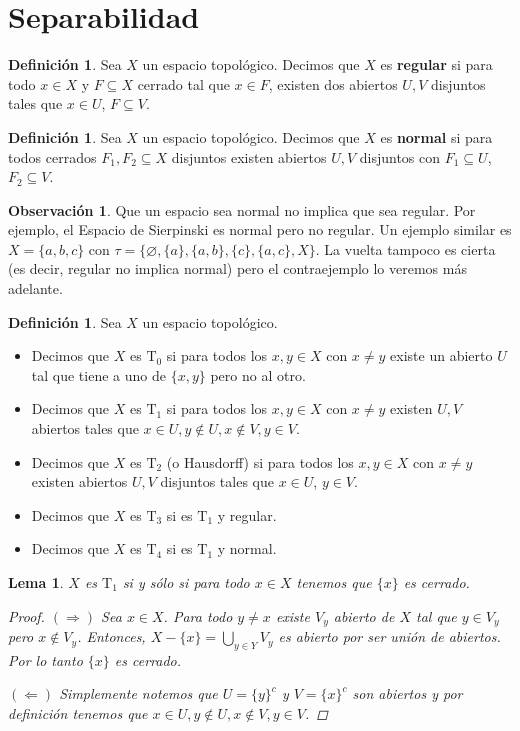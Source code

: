 \documentclass[12pt]{book}
\newtheorem{lem}[teo]{Lema}
\theoremstyle{definition}
\newtheorem{obs}[teo]{Observación}
\newtheorem{defn}[teo]{Definición}
\let\emptyset\varnothing
\begin{document}
\section{Separabilidad}

\begin{defn}
Sea $X$ un espacio topológico. Decimos que $X$ es \textbf{regular} si para todo $x\in X$ y $F\subseteq X$ cerrado tal que $x\in F$, existen dos abiertos $U,V$ disjuntos tales que $x\in U$, $F\subseteq V$.
\end{defn}

\begin{defn}
Sea $X$ un espacio topológico. Decimos que $X$ es \textbf{normal} si para todos cerrados $F_1,F_2\subseteq X$ disjuntos existen abiertos $U,V$ disjuntos con $F_1\subseteq U$, $F_2\subseteq V$.
\end{defn}

\begin{obs}
Que un espacio sea normal no implica que sea regular. Por ejemplo, el Espacio de Sierpinski es normal pero no regular. Un ejemplo similar es $X=\{a,b,c\}$ con $\tau = \{\emptyset, \{a\}, \{a,b\}, \{c\}, \{a,c\},X\}$. La vuelta tampoco es cierta (es decir, regular no implica normal) pero el contraejemplo lo veremos más adelante.
\end{obs}

\begin{defn}
Sea $X$ un espacio topológico.
\begin{itemize}\item Decimos que $X$ es $\mathrm{T}_0$ si para todos los $x,y\in X$ con $x\neq y$ existe un abierto $U$ tal que tiene a uno de $\{x,y\}$ pero no al otro.
\item Decimos que $X$ es $\mathrm{T}_1$ si para todos los $x,y\in X$ con $x\neq y$ existen $U,V$ abiertos tales que $x\in U, y\notin U, x\notin V, y\in V$.
\item Decimos que $X$ es $\mathrm{T}_2$ (o Hausdorff) si para todos los $x,y\in X$ con $x\neq y$ existen abiertos $U,V$ disjuntos tales que $x\in U$, $y\in V$.
\item Decimos que $X$ es $\mathrm{T}_3$ si es $\mathrm{T}_1$ y regular.
\item Decimos que $X$ es $\mathrm{T}_4$ si es $\mathrm{T}_1$ y normal.
\end{itemize}
\end{defn}

\begin{lem}
$X$ es $\mathrm{T}_1$ si y sólo si para todo $x\in X$ tenemos que $\{x\}$ es cerrado.
\begin{proof}
$(\Longrightarrow)$ Sea $x\in X$. Para todo $y\neq x$ existe $V_y$ abierto de $X$ tal que $y\in V_y$ pero $x\notin V_y$. Entonces, $X-\{x\} = \displaystyle\bigcup_{y\in Y}V_y$ es abierto por ser unión de abiertos. Por lo tanto $\{x\}$ es cerrado.

$(\Longleftarrow)$ Simplemente notemos que $U = \{y\}^c$ y $V = \{x\}^c$ son abiertos y por definición tenemos que $x\in U, y\notin U, x\notin V, y\in V$.
\end{proof}
\end{lem}
\end{document}
